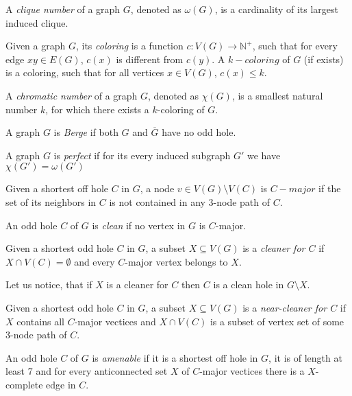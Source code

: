\begin{defn}
  A \emph{clique number} of a graph $G$, denoted as $\omega(G)$, is a cardinality of its largest induced clique.
\end{defn}

\begin{defn}[coloring]
  Given a graph $G$, its \emph{coloring} is a function $c: V(G) \rightarrow \mathbb{N}^+$, such that for every edge $xy \in E(G)$, $c(x)$ is different from $c(y)$. A $k-coloring$ of $G$ (if exists) is a coloring, such that for all vertices $x \in V(G)$, $c(x) \leq k$.
\end{defn}

\begin{defn}
  A \emph{chromatic number} of a graph $G$, denoted as $\chi(G)$, is a smallest natural number $k$, for which there exists a $k$-coloring of $G$.
\end{defn}

\begin{defn}
  \label{def:bergeGraph}
  A graph $G$ is \emph{Berge} if both $G$ and $\overline{G}$ have no odd hole.
\end{defn}

\begin{defn}
  \label{def:perfectGraph}
  A graph $G$ is \emph{perfect} if for its every induced subgraph $G'$ we have $\chi(G') = \omega(G')$
\end{defn}

\begin{defn}
  Given a shortest off hole $C$ in $G$, a node $v \in V(G) \setminus V(C)$ is $C-major$ if the set of its neighbors in $C$ is not contained in any 3-node path of $C$.
\end{defn}

\begin{defn}
  An odd hole $C$ of $G$ is \emph{clean} if no vertex in $G$ is $C$-major.
\end{defn}

\begin{defn}[cleaner]
  Given a shortest odd hole $C$ in $G$, a subset $X \subseteq V(G)$ is a \emph{cleaner for $C$} if $X \cap V(C) = \emptyset$ and every $C$-major vertex belongs to $X$.
\end{defn}

Let us notice, that if $X$ is a cleaner for $C$ then $C$ is a clean hole in $G \setminus X$.

\begin{defn}
  Given a shortest odd hole $C$ in $G$, a subset $X \subseteq V(G)$ is a \emph{near-cleaner for $C$} if $X$ contains all $C$-major vectices and $X \cap V(C)$ is a subset of vertex set of some 3-node path of $C$.
\end{defn}

\begin{defn}
  An odd hole $C$ of $G$ is \emph{amenable} if it is a shortest off hole in $G$, it is of length at least 7 and for every anticonnected set $X$ of $C$-major vectices there is a $X$-complete edge in $C$.
\end{defn}